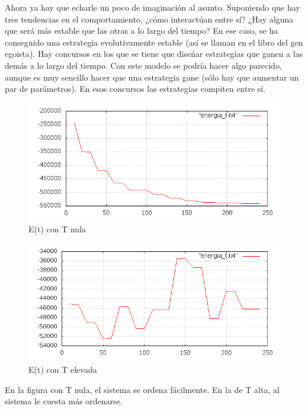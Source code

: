 \documentclass[a4paper,10pt,twocolumn]{article}
\begin{document}
Ahora ya hay que echarle un poco de imaginaci\'on al asunto. Suponiendo que hay tres tendencias en el comportamiento, ¿c\'omo interact\'uan entre s\'i? ¿Hay alguna que ser\'a m\'as estable que las otras a lo largo del tiempo? En ese caso, se ha conseguido una estrategia evolutivamente estable (as\'i se llaman en el libro del gen egoista). Hay concursos en los que se tiene que dise\'nar estrategias que ganen a las dem\'as a lo largo del tiempo. Con este modelo se podr\'ia hacer algo parecido, aunque es muy sencillo hacer que una estrategia gane (s\'olo hay que aumentar un par de par\'ametros). En esos concursos las estrategias compiten entre s\'i.
\begin{figure}
\includegraphics[scale=.4]{E-0-1-0-precavido.png}
\caption{E(t) con T nula}
\end{figure}
\begin{figure}
\includegraphics[scale=.4]{E-10000-1-0-precavido.png}
\caption{E(t) con T elevada}
\end{figure}

En la figura con T nula, el sistema se ordena f\'acilmente. En la de T alta, al sistema le cuesta m\'as ordenarse.
\end{document}
